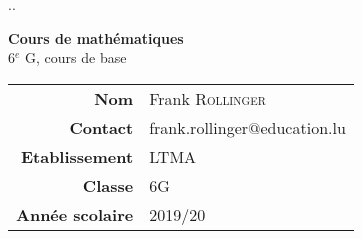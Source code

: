 \documentclass[a4paper, 11pt, oneside, BCOR=0mm, DIV=15]{scrbook} %
\def\classe{6G}
\def\season{2019/20}
\begin{document}
\thispagestyle{empty}
{\color{white}.\hfill.}
\vspace{5cm}

\begin{center}
\huge
{\bfseries Cours de mathématiques} \\
6$^e$ G, cours de base
\end{center}

\vfill

\large
\begin{center}
\begin{tabular}{r|l}
\textbf{Nom}
 & Frank {\scshape Rollinger} \\
\textbf{Contact}
 & {frank.rollinger$@$education.lu} \\
\textbf{Etablissement}
 & {\scshape LTMA} \\
\textbf{Classe}
 & {\scshape \classe} \\
\textbf{Année scolaire}
 & {\scshape \season}
\end{tabular}
\end{center}


\clearpage



%
%
%
%
%
%
\end{document}

